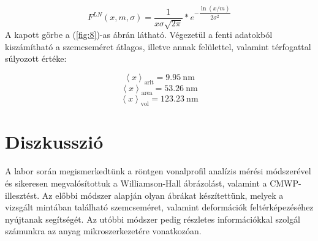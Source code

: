 \begin{multicols}{2}
\begin{equation}
F^{LN} \left(x, m, \sigma \right)
=
\frac{1}{x \sigma \sqrt{2 \pi}} * e^{-\dfrac{\ln \left( x / m \right)}{2 \sigma^{2}}}
\end{equation}
A kapott görbe a (\ref{fig:8})-as ábrán látható. Végezetül a fenti adatokból kiszámítható a szemcseméret átlagos, illetve annak felülettel, valamint térfogattal súlyozott értéke:

\begin{equation}
\left< x \right>_{\text{arit}}
=
9.95\ \text{nm}
\end{equation}
\begin{equation}
\left< x \right>_{\text{area}}
=
53.26\ \text{nm}
\end{equation}
\begin{equation}
\left< x \right>_{\text{vol}}
=
123.23\ \text{nm}
\end{equation}

\section{Diszkusszió}
A labor során megismerkedtünk a röntgen vonalprofil analízis mérési módszerével és sikeresen megvalósítottuk a Williamson-Hall ábrázolást, valamint a CMWP-illesztést. Az előbbi módszer alapján olyan ábrákat készítettünk, melyek a vizsgált mintában található szemcseméret, valamint deformációk feltérképezéséhez nyújtanak segítségét. Az utóbbi módszer pedig részletes információkkal szolgál számunkra az anyag mikroszerkezetére vonatkozóan.

\end{multicols}